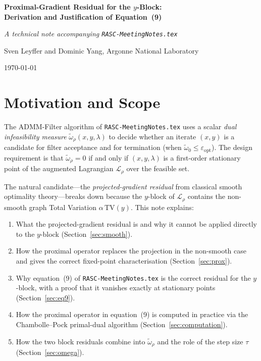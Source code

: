 \documentclass[11pt]{article}
\newcommand{\TV}{\mathrm{TV}}
\theoremstyle{plain}
\theoremstyle{remark}
\begin{document}
\begin{center}
  {\Large\bfseries Proximal-Gradient Residual for the $y$-Block:\\
  Derivation and Justification of Equation~(9)}

  \medskip
  {\em A technical note accompanying \texttt{RASC-MeetingNotes.tex}}

  \smallskip
  Sven Leyffer and Dominic Yang, Argonne National Laboratory

  \smallskip
  \today
\end{center}

\tableofcontents

\section{Motivation and Scope}

The ADMM-Filter algorithm of \texttt{RASC-MeetingNotes.tex} uses a scalar
\emph{dual infeasibility measure} $\widetilde{\omega}_\rho(x,y,\lambda)$ to
decide whether an iterate $(x,y)$ is a candidate for filter acceptance and
for termination (when $\widetilde{\omega}_0 \leq \varepsilon_{\mathrm{opt}}$).
The design requirement is that $\widetilde{\omega}_\rho = 0$ if and only if
$(x,y,\lambda)$ is a first-order stationary point of the augmented Lagrangian
$\mathcal{L}_\rho$ over the feasible set.

The natural candidate---the \emph{projected-gradient residual} from classical
smooth optimality theory---breaks down because the $y$-block
of $\mathcal{L}_\rho$ contains the non-smooth graph Total Variation
$\alpha\,\TV(y)$.
This note explains:
\begin{enumerate}
  \item[(i)] What the projected-gradient residual is and why it cannot be
             applied directly to the $y$-block (Section~\ref{sec:smooth}).
  \item[(ii)] How the proximal operator replaces the projection in the
              non-smooth case and gives the correct fixed-point
              characterisation (Section~\ref{sec:prox}).
  \item[(iii)] Why equation~(9) of \texttt{RASC-MeetingNotes.tex} is the
               correct residual for the $y$-block, with a proof that it
               vanishes exactly at stationary points (Section~\ref{sec:eq9}).
  \item[(iv)] How the proximal operator in equation~(9) is computed in
              practice via the Chambolle--Pock primal-dual algorithm
              (Section~\ref{sec:computation}).
  \item[(v)] How the two block residuals combine into
             $\widetilde{\omega}_\rho$ and the role of the step size $\tau$
             (Section~\ref{sec:omega}).
\end{enumerate}
\end{document}
